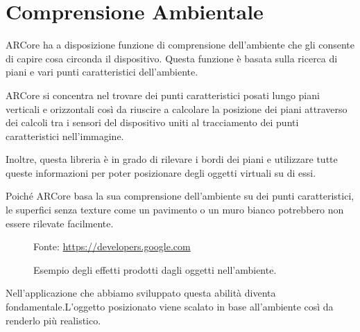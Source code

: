 \documentclass[crop=false, class=book]{standalone}
\begin{document}
	\section{Comprensione Ambientale}
	\label{sec:Enviromental_Understanding}
	ARCore ha a disposizione funzione di comprensione dell’ambiente che gli consente di capire cosa circonda il dispositivo. Questa funzione è basata sulla ricerca di piani e vari punti caratteristici dell’ambiente.
	
	ARCore si concentra nel trovare dei punti caratteristici posati lungo piani verticali e orizzontali così da riuscire a calcolare la posizione dei piani attraverso dei calcoli tra i sensori del dispositivo uniti al tracciamento dei punti caratteristici nell’immagine. 
	
	Inoltre, questa libreria è in grado di rilevare i bordi dei piani e utilizzare tutte queste informazioni per poter posizionare degli oggetti virtuali su di essi.
	
	Poiché ARCore basa la sua comprensione dell’ambiente su dei punti caratteristici, le superfici senza texture come un pavimento o un muro bianco potrebbero non essere rilevate facilmente.

	\begin{center}
		\begin{figure}[htp]
			\centering
			{Fonte: \url{https://developers.google.com}}
			\caption{Esempio degli effetti prodotti dagli oggetti nell'ambiente.}
			\label{fig:env_und}
		\end{figure}
	\end{center}
	
	Nell'applicazione che abbiamo sviluppato questa abilità diventa fondamentale.L'oggetto posizionato viene scalato in base all'ambiente così da renderlo più realistico.
	
\end{document}
